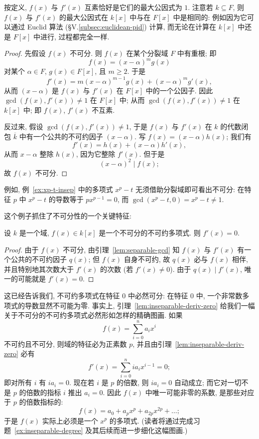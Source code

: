 按定义, $f(x)$ 与 $f'(x)$ 互素恰好是它们的最大公因式为 $1$. 注意若 $k\subseteq F$, 则 $f(x)$ 与 $f'(x)$ 的最大公因式在 $k[x]$ 中与在 $F[x]$ 中是相同的: 例如因为它可以通过 Euclid 算法 (§V.\ref{subsec:euclidean-pid}) 计算, 而无论在计算在 $k[x]$ 中还是 $F[x]$ 中进行, 过程都完全一样.

\begin{proof}
先假设 $f(x)$ 不可分. 则 $f(x)$ 在某个分裂域 $F$ 中有重根; 即
\[
f(x)=(x-\alpha)^mg(x)
\]
对某个 $\alpha\in F$, $g(x)\in F[x]$, 且 $m\geq 2$. 于是
\[
f'(x)=m(x-\alpha)^{m-1}g(x)+(x-\alpha)^mg'(x),
\]
从而 $(x-\alpha)$ 是 $f(x)$ 与 $f'(x)$ 在 $F[x]$ 中的一个公因子. 因此 $\gcd(f(x),f'(x))\neq 1$ 在 $F[x]$ 中; 从而 $\gcd(f(x),f'(x))\neq 1$ 在 $k[x]$ 中; 即 $f(x)$, $f'(x)$ 不互素.

反过来, 假设 $\gcd(f(x),f'(x))\neq 1$, 于是 $f(x)$ 与 $f'(x)$ 在 $k$ 的代数闭包 $\overline{k}$ 中有一个公共的不可约因子 $(x-\alpha)$. 写 $f(x)=(x-\alpha)h(x)$; 我们有
\[
f'(x)=h(x)+(x-\alpha)h'(x),
\]
从而 $x-\alpha$ 整除 $h(x)$, 因为它整除 $f'(x)$. 但于是
\[
(x-\alpha)^2\mid f(x);
\]
故 $f(x)$ 不可分.
\end{proof}

例如, 例~\ref{ex:xp-t-insep} 中的多项式 $x^p-t$ 无须借助分裂域即可看出不可分: 在特征 $p$ 中 $x^p-t$ 的导数等于 $px^{p-1}=0$, 而 $\gcd(x^p-t,0)=x^p-t\neq 1$.

这个例子抓住了不可分性的一个关键特征:

\begin{lemma}\label{lem:inseparable-deriv-zero}
设 $k$ 是一个域, $f(x)\in k[x]$ 是一个不可分的不可约多项式. 则 $f'(x)=0$.
\end{lemma}

\begin{proof}
由于 $f(x)$ 不可分, 由引理~\ref{lem:separable-gcd} 知 $f(x)$ 与 $f'(x)$ 有一个公共的不可约因子 $q(x)$; 但 $f(x)$ 自身不可约, 故 $q(x)$ 必与 $f(x)$ 相伴, 并且特别地其次数大于 $f'(x)$ 的次数 (若 $f'(x)\neq 0$). 由于 $q(x)\mid f'(x)$, 唯一的可能就是 $f'(x)=0$.
\end{proof}

这已经告诉我们, 不可约多项式在特征 $0$ 中必然可分: 在特征 $0$ 中, 一个非常数多项式的导数显然不可能为零. 事实上, 引理~\ref{lem:inseparable-deriv-zero} 给我们一幅关于不可分的不可约多项式必然形如怎样的精确图画. 如果
\[
f(x)=\sum_{i=0}^{n}a_ix^i
\]
不可约且不可分, 则域的特征必为正素数 $p$, 并且由引理~\ref{lem:inseparable-deriv-zero} 必有
\[
f'(x)=\sum_{i=0}^{n}ia_ix^{i-1}=0;
\]
即对所有 $i$ 有 $ia_i=0$. 现在若 $i$ 是 $p$ 的倍数, 则 $ia_i=0$ 自动成立; 而它对一切不是 $p$ 的倍数的指标 $i$ 推出 $a_i=0$. 因此 $f(x)$ 中唯一可能非零的系数, 是那些对应于 $p$ 的倍数指标的:
\[
f(x)=a_0+a_px^p+a_{2p}x^{2p}+\ldots;
\]
于是 $f(x)$ 实际上必须是一个 $x^p$ 的多项式. (读者将通过完成习题~\ref{ex:inseparable-degree} 及其后续而进一步细化这幅图画.)

